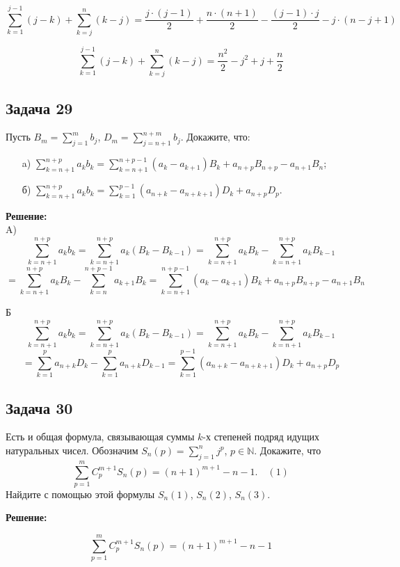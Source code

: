 \documentclass[a4paper,12pt]{article}
\begin{document}
\[
\sum_{k=1}^{j-1} (j - k) + \sum_{k=j}^{n} (k - j) = \frac{j \cdot (j-1)}{2} + \frac{n \cdot (n+1)}{2} - \frac{(j-1) \cdot j}{2} - j \cdot (n - j + 1)
\]

\[
\sum_{k=1}^{j-1} (j - k) + \sum_{k=j}^{n} (k - j) = \frac{n^2}{2} - j^2 + j + \frac{n}{2}
\]
\vspace{1cm}


\subsection{Задача 29}
Пусть \(B_m = \sum_{j=1}^{m} b_j\), \(D_m = \sum_{j=n+1}^{n+m} b_j\). Докажите, что:
\begin{itemize}
    \item[a)] \(\sum_{k=n+1}^{n+p} a_k b_k = \sum_{k=n+1}^{n+p-1} (a_k - a_{k+1})B_k + a_{n+p} B_{n+p} - a_{n+1} B_n\);
    \item[б)] \(\sum_{k=n+1}^{n+p} a_k b_k = \sum_{k=1}^{p-1} (a_{n+k} - a_{n+k+1})D_k + a_{n+p} D_p\).
\end{itemize}

\textbf{Решение:}\\
A)\\
\[
\sum_{k=n+1}^{n+p} a_k b_k = \sum_{k=n+1}^{n+p} a_k (B_k - B_{k-1}) = \sum_{k=n+1}^{n+p} a_k B_k - \sum_{k=n+1}^{n+p} a_k B_{k-1}
\]
\[
= \sum_{k=n+1}^{n+p} a_k B_k - \sum_{k=n}^{n+p-1} a_{k+1} B_k = \sum_{k=n+1}^{n+p-1} (a_k - a_{k+1}) B_k + a_{n+p} B_{n+p} - a_{n+1} B_n
\]

Б\\
\[
\sum_{k=n+1}^{n+p} a_k b_k = \sum_{k=n+1}^{n+p} a_k (B_k - B_{k-1}) = \sum_{k=n+1}^{n+p} a_k B_k - \sum_{k=n+1}^{n+p} a_k B_{k-1}
\]
\[
= \sum_{k=1}^{p} a_{n+k} D_k - \sum_{k=1}^{p} a_{n+k} D_{k-1} = \sum_{k=1}^{p-1} (a_{n+k} - a_{n+k+1})D_k + a_{n+p} D_p
\]
\vspace{1cm}

\subsection{Задача 30}
Есть и общая формула, связывающая суммы \(k\)-х степеней подряд идущих натуральных чисел. Обозначим \(S_n(p) = \sum_{j=1}^{n} j^p\), \(p \in \mathbb{N}\). Докажите, что
\[
\sum_{p=1}^{m} C_p^{m+1} S_n(p) = (n+1)^{m+1} - n - 1. \quad (1)
\]
Найдите с помощью этой формулы \(S_n(1)\), \(S_n(2)\), \(S_n(3)\).

\textbf{Решение:}

\[
\sum_{p=1}^{m} C_p^{m+1} S_n(p) = (n+1)^{m+1} - n - 1
\]
\end{document}
